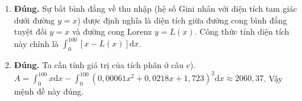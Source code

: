 \begin{ex}
{\begin{enumerate}
\begin{itemize}
				\item $L(20) = (0{,}00061\cdot 20^2+0{,}0218\cdot 20+1{,}723)^2 = (0{,}244+0{,}436+1{,}723)^2 = (2{,}403)^2 \approx  5{,}77$.
			\end{itemize}
			Thu nhập của nhóm 3 là $8{,}56\% - 5{,}77\% = 2{,}79\%$.  Con số $8{,}56\%$ là tổng thu nhập của 3 nhóm đầu tiên.
			\item \textbf{Đúng.} Sự bất bình  đẳng về thu nhập (hệ số Gini nhân với diện tích tam giác dưới đường $y=x$) được định nghĩa là diện tích giữa đường cong bình đẳng tuyệt đối $y=x$ và đường cong Lorenz $y=L(x)$. Công thức tính diện tích này chính là $\displaystyle\int_0^{100} [x - L(x)]\mathrm{d}x$.
			\item \textbf{Đúng.} Ta cần tính giá trị của tích phân  ở câu c).
			$A  = \displaystyle\int_0^{100} x \mathrm{d}x - \int_0^{100} (0{,}00061x^2+0{,}0218x+1{,}723)^2 \mathrm{d}x \approx 2060{,}37$.
			Vậy mệnh đề này  đúng.
		\end{enumerate}
	 }
\end{ex}

